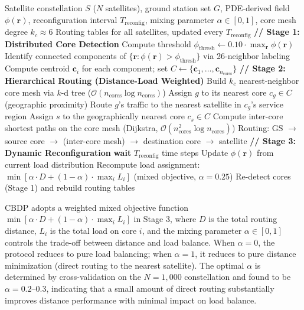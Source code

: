 \documentclass[sn-nature,pdflatex]{sn-jnl}
\begin{document}
\begin{algorithm}[htbp]
\caption{Core-Based Distributed Protocol (CBDP)}
\label{alg:cbdp_en}
\begin{algorithmic}[1]
\REQUIRE Satellite constellation $S$ ($N$ satellites), ground station set $G$, PDE-derived field $\phi(\mathbf{r})$, reconfiguration interval $T_{\text{reconfig}}$, mixing parameter $\alpha \in [0,1]$, core mesh degree $k_c \approx 6$
\ENSURE Routing tables for all satellites, updated every $T_{\text{reconfig}}$
\STATE \textbf{// Stage 1: Distributed Core Detection}
\STATE Compute threshold $\phi_{\text{thresh}} \gets 0.10 \cdot \max_{\mathbf{r}} \phi(\mathbf{r})$
\STATE Identify connected components of $\{\mathbf{r} : \phi(\mathbf{r}) > \phi_{\text{thresh}}\}$ via 26-neighbor labeling
\STATE Compute centroid $\mathbf{c}_i$ for each component; set $C \gets \{\mathbf{c}_1, \ldots, \mathbf{c}_{n_{\text{cores}}}\}$
\STATE \textbf{// Stage 2: Hierarchical Routing (Distance-Load Weighted)}
\STATE Build $k_c$ nearest-neighbor core mesh via $k$-d tree ($\mathcal{O}(n_{\text{cores}} \log n_{\text{cores}})$)
\ENDFOR
{}
\STATE Assign $g$ to its nearest core $c_g \in C$ (geographic proximity)
\STATE Route $g$'s traffic to the nearest satellite in $c_g$'s service region
\ENDFOR
{}
\STATE Assign $s$ to the geographically nearest core $c_s \in C$
\ENDFOR
\STATE Compute inter-core shortest paths on the core mesh (Dijkstra, $\mathcal{O}(n_{\text{cores}}^2 \log n_{\text{cores}})$)
\STATE Routing: GS $\to$ source core $\to$ (inter-core mesh) $\to$ destination core $\to$ satellite
\STATE \textbf{// Stage 3: Dynamic Reconfiguration}
\LOOP
\STATE \textbf{wait} $T_{\text{reconfig}}$ time steps
\STATE Update $\phi(\mathbf{r})$ from current load distribution
\STATE Recompute load assignment: $\min [\alpha \cdot D + (1-\alpha) \cdot \max_i L_i]$ (mixed objective, $\alpha = 0.25$)
\STATE Re-detect cores (Stage 1) and rebuild routing tables
\ENDLOOP
\end{algorithmic}
\end{algorithm}

CBDP adopts a weighted mixed objective function $\min [\alpha \cdot D + (1-\alpha) \cdot \max_i L_i]$ in Stage 3, where $D$ is the total routing distance, $L_i$ is the total load on core $i$, and the mixing parameter $\alpha \in [0, 1]$ controls the trade-off between distance and load balance. When $\alpha = 0$, the protocol reduces to pure load balancing; when $\alpha = 1$, it reduces to pure distance minimization (direct routing to the nearest satellite). The optimal $\alpha$ is determined by cross-validation on the $N=1,000$ constellation and found to be $\alpha = 0.2$--$0.3$, indicating that a small amount of direct routing substantially improves distance performance with minimal impact on load balance.
\end{document}
